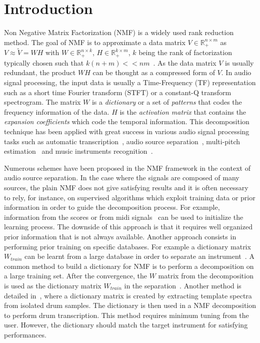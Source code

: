 \section{Introduction}
\label{sec:intro}

Non Negative Matrix Factorization (NMF) is a widely used rank reduction method. The goal of NMF is to approximate a data matrix $V \in \mathbb{R}_{+}^{n \times m} $ as $V \approx \tilde{V} = WH$ with $W \in \mathbb{R}_{+}^{n \times k}$, $H \in \mathbb{R}_{+}^{k \times m}$, $k$ being the rank of factorization typically chosen such that \mbox{$k(n+m) << nm  $}~\cite{lee99}. As the data matrix $V$ is usually redundant, the product $WH$ can be thought as a compressed form of $V$. In audio signal processing, the input data is usually a Time-Frequency (TF) representation such as a short time Fourier transform (STFT) or a constant-Q transform spectrogram. The matrix $W$ is a {\em dictionary} or a set of {\em patterns} that codes the frequency information of the data. $H$ is the {\em activation matrix} that contains the {\em expansion coefficients} which code the temporal information.
This decomposition technique has been applied with great success in various audio signal processing tasks such as automatic transcription~\cite{EwertM12,NB:ICASSP-07}, audio source separation~\cite{HennequinDAFx2010,JLD:TASLP10}, multi-pitch estimation~\cite{raczynski2007multipitch} and music instruments recognition~\cite{cichocki2009nonnegative}.

Numerous schemes have been proposed in the NMF framework in the context of audio source separation. In the case where the signals are composed of many sources, the plain NMF does not give satisfying results and it is often necessary to rely, for instance, on supervised algorithms which exploit training data or prior information in order to guide the decomposition process. For example, information from the scores or from midi signals~\cite{EwertM12} can be used to initialize the learning process. The downside of this approach is that it requires well organized prior information that is not always available. Another approach consists in performing prior training on specific databases. For example a dictionary matrix $W_{train}$ can be learnt from a large database in order to separate an instrument~\cite{jaureguiberry2011adaptation,wudrum}. A common method to build a dictionary for NMF is to perform a decomposition on a large training set. After the convergence, the $W$ matrix from the decomposition is used as the dictionary matrix $W_{train}$ in the separation~\cite{jaureguiberry2011adaptation}. Another method is detailed in~\cite{wudrum}, where a dictionary matrix is created by extracting template spectra from isolated drum samples. The dictionary is then used in a NMF decomposition to perform drum transcription. This method requires minimum tuning from the user. However, the dictionary should match the target instrument for satisfying performances. 

